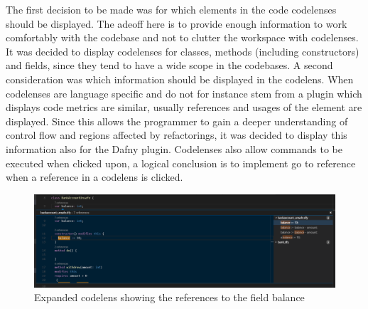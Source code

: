 The first decision to be made was for which elements in the code codelenses should be displayed. The adeoff here is to  provide enough information to work comfortably with the codebase and not to clutter the workspace with codelenses. It was decided to display codelenses for classes, methods (including constructors) and fields, since they tend to have a wide scope in the codebases. \newline
A second consideration was which information should be displayed in the codelens. When codelenses are language specific and do not for instance stem from a plugin which displays code metrics are similar, usually references and usages of the element are displayed. Since this allows the programmer to gain a deeper understanding of control flow and regions affected by refactorings, it was decided to display this information also for the Dafny plugin. Codelenses also allow commands to be executed when clicked upon, a logical conclusion is to implement go to reference when a reference in a codelens is clicked.\newline

\begin{figure}[H]
	\centering
	\includegraphics[width=1\textwidth]{img/codelensesExpanded}
	\caption{Expanded codelens showing the references to the field balance}
	\label{fig:codelensesexpanded}
\end{figure}

